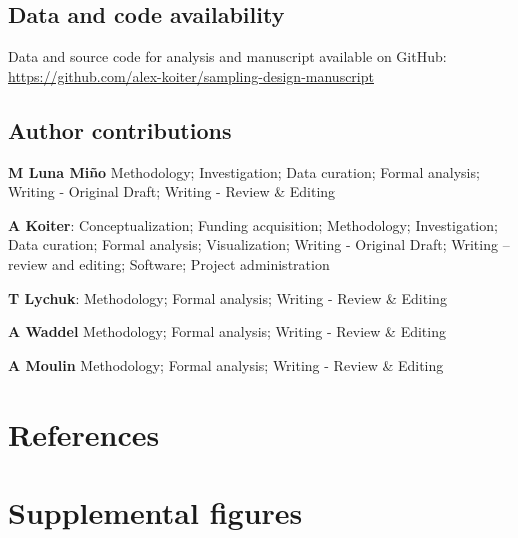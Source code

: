\documentclass[
  number]{elsarticle}
\begin{document}
\subsection*{Data and code
availability}\label{data-and-code-availability}

Data and source code for analysis and manuscript available on GitHub:
\url{https://github.com/alex-koiter/sampling-design-manuscript}

\subsection*{Author contributions}\label{author-contributions}

\textbf{M Luna Miño} Methodology; Investigation; Data curation; Formal
analysis; Writing - Original Draft; Writing - Review \& Editing

\textbf{A Koiter}: Conceptualization; Funding acquisition; Methodology;
Investigation; Data curation; Formal analysis; Visualization; Writing -
Original Draft; Writing -- review and editing; Software; Project
administration

\textbf{T Lychuk}: Methodology; Formal analysis; Writing - Review \&
Editing

\textbf{A Waddel} Methodology; Formal analysis; Writing - Review \&
Editing

\textbf{A Moulin} Methodology; Formal analysis; Writing - Review \&
Editing

\section*{References}\label{references}

\renewcommand{\bibsection}{}


\section*{Supplemental figures}\label{supplemental-figures}
\end{document}
